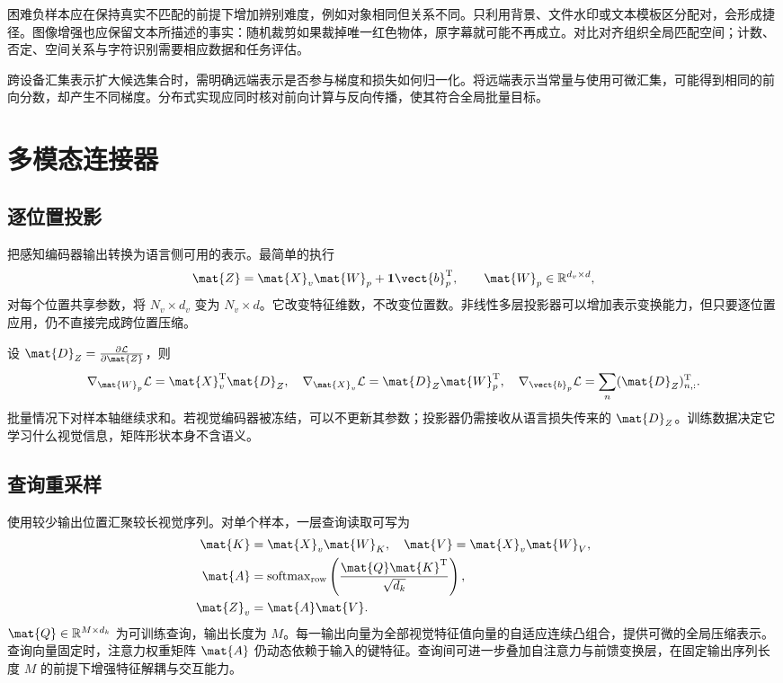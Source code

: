 \documentclass[../textbook.tex]{subfiles}
\begin{document}
困难负样本应在保持真实不匹配的前提下增加辨别难度，例如对象相同但关系不同。只利用背景、文件水印或文本模板区分配对，会形成捷径。图像增强也应保留文本所描述的事实：随机裁剪如果裁掉唯一红色物体，原字幕就可能不再成立。对比对齐组织全局匹配空间；计数、否定、空间关系与字符识别需要相应数据和任务评估。

跨设备汇集表示扩大候选集合时，需明确远端表示是否参与梯度和损失如何归一化。将远端表示当常量与使用可微汇集，可能得到相同的前向分数，却产生不同梯度。分布式实现应同时核对前向计算与反向传播，使其符合全局批量目标。

\section{多模态连接器}

\subsection{逐位置投影}
把感知编码器输出转换为语言侧可用的表示。最简单的执行
\begin{equation}
 \mat{Z}=\mat{X}_v\mat{W}_p+\mathbf1\vect{b}_p^{\mathrm{T}},\qquad \mat{W}_p\in\mathbb R^{d_v\times d},
\end{equation}
对每个位置共享参数，将 $N_v\times d_v$ 变为 $N_v\times d$。它改变特征维数，不改变位置数。非线性多层投影器可以增加表示变换能力，但只要逐位置应用，仍不直接完成跨位置压缩。

设 $\mat{D}_Z=\frac{\partial\mathcal L}{\partial \mat{Z}}$，则
\begin{equation}
 \nabla_{\mat{W}_p}\mathcal L=\mat{X}_v^{\mathrm{T}}\mat{D}_Z,\quad
 \nabla_{\mat{X}_v}\mathcal L=\mat{D}_Z\mat{W}_p^{\mathrm{T}},\quad
 \nabla_{\vect{b}_p}\mathcal L=\sum_n(\mat{D}_Z)_{n,:}^{\mathrm{T}}.
\end{equation}
批量情况下对样本轴继续求和。若视觉编码器被冻结，可以不更新其参数；投影器仍需接收从语言损失传来的 $\mat{D}_Z$。训练数据决定它学习什么视觉信息，矩阵形状本身不含语义。

\subsection{查询重采样}
使用较少输出位置汇聚较长视觉序列。对单个样本，一层查询读取可写为
\begin{align}
 \mat{K}&=\mat{X}_v\mat{W}_K,\quad \mat{V}=\mat{X}_v\mat{W}_V,\\
 \mat{A}&=\operatorname{softmax}_{\mathrm{row}}\left(\frac{\mat{Q}\mat{K}^{\mathrm{T}}}{\sqrt{d_k}}\right),\\
 \mat{Z}_v&=\mat{A}\mat{V}.
 \label{eq:mm-resample}
\end{align}
$\mat{Q}\in\mathbb R^{M\times d_k}$ 为可训练查询，输出长度为 $M$。每一输出向量为全部视觉特征值向量的自适应连续凸组合，提供可微的全局压缩表示。查询向量固定时，注意力权重矩阵 $\mat{A}$ 仍动态依赖于输入的键特征。查询间可进一步叠加自注意力与前馈变换层，在固定输出序列长度 $M$ 的前提下增强特征解耦与交互能力。
\end{document}
